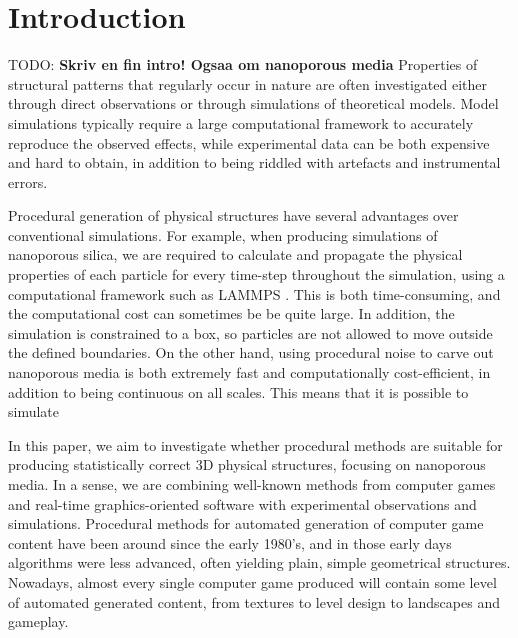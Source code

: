 \documentclass[aps,pre,twocolumn,letterpaper,floatfix,showpacs]{revtex4}
\newcommand{\todo}[1]{ {\color{Magenta} TODO: \color{Blue} \textbf{#1} }}
\begin{document}
\section{Introduction}

\todo{Skriv en fin intro! Ogsaa om nanoporous media}
Properties of structural patterns that regularly occur in nature are often investigated either through direct observations or through simulations of theoretical models. Model simulations typically require a large computational framework to accurately reproduce the observed effects, while experimental data can be both expensive and hard to obtain, in addition to being riddled with artefacts and instrumental errors.   

Procedural generation of physical structures have several advantages over conventional simulations. For example, when producing simulations of nanoporous silica, we are required to calculate and propagate the physical properties of each particle for every time-step throughout the simulation, using a computational framework such as LAMMPS \cite{plimpton1995fast}. This is both time-consuming, and the computational cost can sometimes be be quite large. In addition, the simulation is constrained to a box, so particles are not allowed to move outside the defined boundaries. On the other hand, using procedural noise to carve out nanoporous media is both extremely fast and computationally cost-efficient, in addition to being continuous on all scales. This means that it is possible to simulate 


In this paper, we aim to investigate whether procedural methods are suitable for producing statistically correct 3D physical structures, focusing on nanoporous media. In a sense, we are combining well-known methods from computer games and real-time graphics-oriented software with experimental observations and simulations. Procedural methods for automated generation of computer game content have been around since the early 1980's, and in those early days algorithms were less advanced, often yielding plain, simple geometrical structures. Nowadays, almost every single computer game produced will contain some level of automated generated content, from textures to level design to landscapes and gameplay. 
\end{document}
